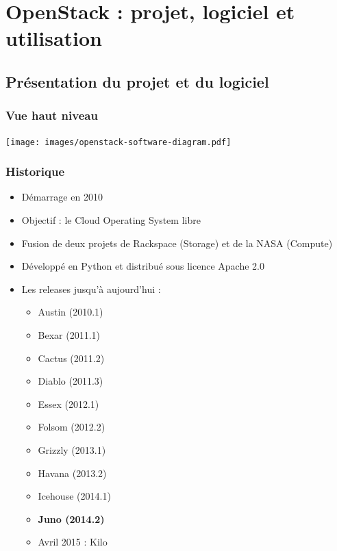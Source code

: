   \section[OpenStack]{OpenStack : projet, logiciel et utilisation}

  \subsection[OpenStack]{Présentation du projet et du logiciel}

  \begin{frame}
    \frametitle{Vue haut niveau}
    \texttt{[image: images/openstack-software-diagram.pdf]}
  \end{frame}

  \begin{frame}
    \frametitle{Historique}
    \begin{itemize}
      \item Démarrage en 2010
      \item Objectif : le Cloud Operating System libre
      \item Fusion de deux projets de Rackspace (Storage) et de la NASA (Compute)
      \item Développé en Python et distribué sous licence Apache 2.0\pause
      \item Les releases jusqu'à aujourd'hui :
      \begin{itemize}
        \item Austin (2010.1)
        \item Bexar (2011.1)
        \item Cactus (2011.2)
        \item Diablo (2011.3)
        \item Essex (2012.1)
        \item Folsom (2012.2)
        \item Grizzly (2013.1)
        \item Havana (2013.2)
        \item Icehouse (2014.1)
        \item \textbf{Juno (2014.2)}\pause
        \item Avril 2015 : Kilo
      \end{itemize}
    \end{itemize}
  \end{frame}

